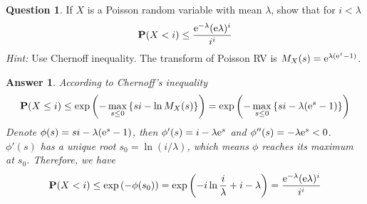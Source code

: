\documentclass[utf8]{article}
\theoremstyle{definition}%
\newtheorem{question}{Question} %
\theoremstyle{plain}%
\newtheorem{answer}{Answer} %
\begin{document}
\begin{question}
    If $X$ is a Poisson random variable with mean $\lambda$, show that for $i < \lambda$
    \begin{equation}
        \mathbf{P}(X < i) \leq \frac{\mathrm{e}^{-\lambda} (\mathrm{e}\lambda)^i}{i^i}
    \end{equation}
    \textit{Hint:} Use Chernoff inequality.  The transform of Poisson RV is $M_X(s) = \mathrm{e}^{\lambda(\mathrm{e}^s - 1)}$.
\end{question}
\begin{answer}
    According to Chernoff's inequality
    \begin{equation}
        \mathbf{P}(X \leq i) \leq \exp\qty(-\max_{s \leq 0} \qty{si - \ln M_X(s)}) = \exp\qty(-\max_{s \leq 0} \qty{si - \lambda(\mathrm{e}^s - 1)})
    \end{equation}
    Denote $\phi(s) = si - \lambda(\mathrm{e}^s - 1)$, then $\phi'(s) = i - \lambda \mathrm{e}^s$ and $\phi''(s) = -\lambda \mathrm{e}^s < 0$. $\phi'(s)$ has a unique root $s_0 = \ln(i/\lambda)$, which means $\phi$ reaches its maximum at $s_0$. Therefore, we have
    \begin{equation}
        \mathbf{P}(X < i) \leq \exp\qty(-\phi(s_0)) = \exp\qty(-i\ln\frac{i}{\lambda} + i - \lambda) = \frac{\mathrm{e}^{-\lambda} (\mathrm{e}\lambda)^i}{i^i}
    \end{equation}
\end{answer}
\end{document}
